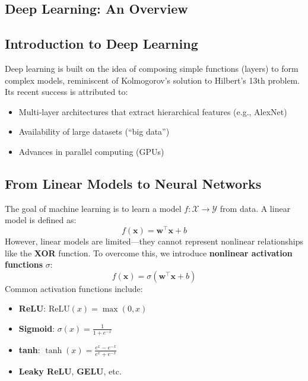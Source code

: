 \begin{notechapter}
\chapter{Deep Learning: An Overview}\label{ch:dl-lecture-notes-ch1}

\section{Introduction to Deep Learning}
Deep learning is built on the idea of composing simple functions (layers) to form complex models, reminiscent of Kolmogorov's solution to Hilbert's 13th problem. Its recent success is attributed to:
\begin{itemize}
    \item Multi-layer architectures that extract hierarchical features (e.g., AlexNet)
    \item Availability of large datasets (``big data'')
    \item Advances in parallel computing (GPUs)
\end{itemize}

\section{From Linear Models to Neural Networks}
The goal of machine learning is to learn a model $f: \mathcal{X} \to \mathcal{Y}$ from data. A linear model is defined as:
\[
f(\mathbf{x}) = \mathbf{w}^\top \mathbf{x} + b
\]
However, linear models are limited—they cannot represent nonlinear relationships like the \textbf{XOR} function. To overcome this, we introduce \textbf{nonlinear activation functions} $\sigma$:
\[
f(\mathbf{x}) = \sigma(\mathbf{w}^\top \mathbf{x} + b)
\]
Common activation functions include:
\begin{itemize}
    \item \textbf{ReLU}: $\text{ReLU}(x) = \max(0, x)$
    \item \textbf{Sigmoid}: $\sigma(x) = \frac{1}{1 + e^{-x}}$
    \item \textbf{tanh}: $\tanh(x) = \frac{e^x - e^{-x}}{e^x + e^{-x}}$
    \item \textbf{Leaky ReLU}, \textbf{GELU}, etc.
\end{itemize}


\end{notechapter}
